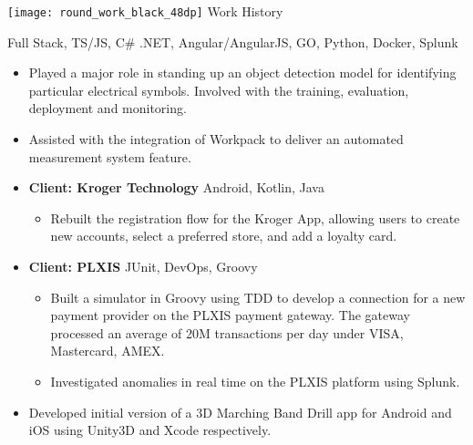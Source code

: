 {\noindent \texttt{[image: round\_work\_black\_48dp]} \hspace{0.25pc}  \large Work History}\hspace{1pc}{\noindent\rule{36.75pc}{0.4pt}}

\vspace{1pc}


{\color{gray} Full Stack, TS/JS, C\# .NET, Angular/AngularJS, GO, Python, Docker, Splunk}

\begin{itemize}
	\item Played a major role in standing up an object detection model for identifying particular electrical symbols. Involved with the training, evaluation, deployment and monitoring.
	\item Assisted with the integration of Workpack to deliver an automated measurement system feature.
\end{itemize}


\begin{itemize}
	\item \textbf{Client: Kroger Technology} \hspace{0.5pc} {\color{gray}Android, Kotlin, Java}
	\begin{itemize}
		\item Rebuilt the registration flow for the Kroger App, allowing users to create new accounts, select a preferred store, and add a loyalty card. 
	\end{itemize}
	\item \textbf{Client: PLXIS} \hspace{0.5pc} {\color{gray} JUnit, DevOps, Groovy}
	\begin{itemize}
		\item Built a simulator in Groovy using TDD to develop a connection for a new payment provider on the PLXIS payment gateway. The gateway processed an average of 20M transactions per day under VISA, Mastercard, AMEX.
		
		\item Investigated anomalies in real time on the PLXIS platform using Splunk.
	\end{itemize}
	
\end{itemize}

\begin{itemize}
	\item Developed initial version of a 3D Marching Band Drill app for Android and iOS using Unity3D and Xcode respectively.
\end{itemize}